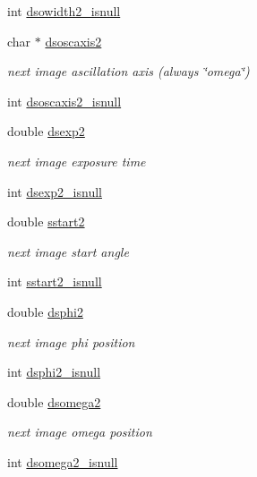 \begin{DoxyCompactItemize}
int \hyperlink{structlspg__nextshot__struct_a5ffd27b8063506fd54162658e5c2ce8a}{dsowidth2\-\_\-isnull}
\item 
char $\ast$ \hyperlink{structlspg__nextshot__struct_ac86005a6e90ff502da9e95b59d0b7a5f}{dsoscaxis2}
\begin{DoxyCompactList}\small\item\em next image ascillation axis (always \char`\"{}omega\char`\"{}) \end{DoxyCompactList}\item 
int \hyperlink{structlspg__nextshot__struct_a98e280e99ae847559bb82836df3c32d1}{dsoscaxis2\-\_\-isnull}
\item 
double \hyperlink{structlspg__nextshot__struct_a4d8c34309572875352ddabe9cc9001ee}{dsexp2}
\begin{DoxyCompactList}\small\item\em next image exposure time \end{DoxyCompactList}\item 
int \hyperlink{structlspg__nextshot__struct_a45091283dc073e5b7da2cfbe5a75fade}{dsexp2\-\_\-isnull}
\item 
double \hyperlink{structlspg__nextshot__struct_a8445cbd2206dc6d62b6bd433f5218c98}{sstart2}
\begin{DoxyCompactList}\small\item\em next image start angle \end{DoxyCompactList}\item 
int \hyperlink{structlspg__nextshot__struct_a240c8532d5ce48dbc872d5123a4e721c}{sstart2\-\_\-isnull}
\item 
double \hyperlink{structlspg__nextshot__struct_a98857616b6bbb6ba861e96b6b7551756}{dsphi2}
\begin{DoxyCompactList}\small\item\em next image phi position \end{DoxyCompactList}\item 
int \hyperlink{structlspg__nextshot__struct_a57a9c43be86188f65b96d59c2adec674}{dsphi2\-\_\-isnull}
\item 
double \hyperlink{structlspg__nextshot__struct_a84ae35abfa725d1bdbff5403f6384ee4}{dsomega2}
\begin{DoxyCompactList}\small\item\em next image omega position \end{DoxyCompactList}\item 
int \hyperlink{structlspg__nextshot__struct_afaf9bdf89a68e7f479969072643e55eb}{dsomega2\-\_\-isnull}
\item 

\end{DoxyCompactItemize}
